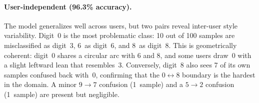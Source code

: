 \begin{table}[H]
\centering
\caption{Confusion matrix -- Domain~1, user-dependent (99.8\%).}
\label{tab:cm_d1_dep}
\end{table}

\paragraph{User-independent (96.3\% accuracy).}
The model generalizes well across users, but two pairs reveal inter-user style variability. Digit~0 is the most problematic class: 10 out of 100 samples are misclassified as digit~3, 6~as digit~6, and 8~as digit~8. This is geometrically coherent: digit~0 shares a circular arc with 6 and 8, and some users draw~0 with a slight leftward lean that resembles~3. Conversely, digit~8 also sees 7 of its own samples confused back with~0, confirming that the $0 \leftrightarrow 8$ boundary is the hardest in the domain. A minor $9 \to 7$ confusion (1~sample) and a $5 \to 2$ confusion (1~sample) are present but negligible.

